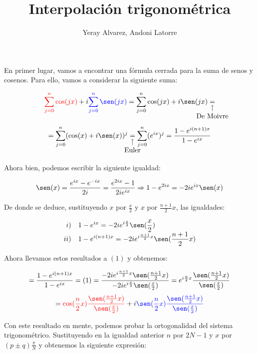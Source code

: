 \documentclass{article}
\title{Interpolación trigonométrica}
\author{\textcolor{WildStrawberry}{Yeray Alvarez, Andoni Latorre}}
\date{}
\newcommand{\nota}[3][2ex]{
    \underset{\mathclap{
        \begin{tikzpicture}
          \draw[->] (0, 0) to ++(0,#1);
          \node[below] at (0,0) {#3};
        \end{tikzpicture}}}{#2}
}
\begin{document}
\maketitle

\noindent En primer lugar, vamos a encontrar una fórmula cerrada para la suma de senos y cosenos. Para ello, vamos a considerar la siguiente suma:

$$
\textcolor{red}{\sum_{j=0}^n \cos(jx)} + i \textcolor{blue}{\sum_{j=0}^n \sen(jx)} = \sum_{j=0}^n \cos(jx) + i \sen(jx) \nota{=}{\text{De Moivre}}
$$
\begin{equation}
=\sum_{j=0}^n (\cos(x) + i \sen(x))^j \nota{=}{\text{Euler}} \sum_{j=0}^n (e^{ix})^j = \frac{1-e^{i(n+1)x}}{1-e^{ix}}
\end{equation}

\noindent Ahora bien, podemos escribir la siguiente igualdad:

$$
\sen(x) = \frac{e^{ix}-e^{-ix}}{2i} = \frac{e^{2ix}-1}{2ie^{ix}} \Rightarrow  1-e^{2ix} = -2ie^{ix}\sen(x)
$$

\noindent De donde se deduce, sustituyendo $x$ por $\frac{x}{2}$ y $x$ por $\frac{n+1}{2}x$, las igualdades:

$$
\begin{array}{rl}
i) & \displaystyle{1-e^{ix} = -2ie^{i\frac{x}{2}}\sen(\frac{x}{2})} \\
ii) & \displaystyle{1-e^{i(n+1)x} = -2ie^{i\frac{n+1}{2}x}\sen(\frac{n+1}{2}x)}
\end{array}
$$

\noindent Ahora llevamos estos resultados a $(1)$ y obtenemos:

$$
= \frac{1-e^{i(n+1)x}}{1-e^{ix}} = (1) 
= \frac{-2ie^{i\frac{n+1}{2}x}\sen(\frac{n+1}{2}x)}{-2ie^{i\frac{x}{2}}\sen(\frac{x}{2})}
= e^{i\frac{n}{2}x} \frac{\sen(\frac{n+1}{2}x)}{\sen(\frac{x}{2})}
$$
$$
= \textcolor{red}{\cos(\frac{n}{2} x ) \frac{\sen(\frac{n+1}{2}x)}{\sen(\frac{x}{2})}} + i \textcolor{blue}{\sen(\frac{n}{2} x ) \frac{\sen(\frac{n+1}{2}x)}{\sen(\frac{x}{2})}}
$$

\noindent Con este resultado en mente, podemos probar la ortogonalidad del sistema trigonométrico.
Sustituyendo en la igualdad anterior $n$ por $2N-1$ y $x$ por $(p \pm q) \frac{\pi}{N}$ y obtenemos la siguiente expresión:
\end{document}
